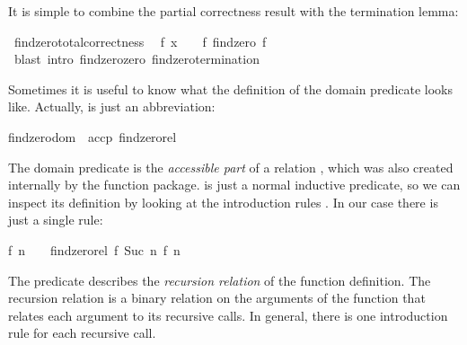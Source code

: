\begin{isabellebody}
%
\isadelimproof
%
\endisadelimproof
%
\begin{isamarkuptext}%
\noindent It is simple to combine the partial correctness result with the
  termination lemma:%
\end{isamarkuptext}%
\isamarkuptrue%
\isamarkupfalse%
\ findzero{\isacharunderscore}total{\isacharunderscore}correctness{\isacharcolon}\isanewline
\ \ {\isachardoublequoteopen}f\ x\ {\isacharequal}\ {}\ {\isasymLongrightarrow}\ f\ {\isacharparenleft}findzero\ f\ {}{\isacharparenright}\ {\isacharequal}\ {}{\isachardoublequoteclose}\isanewline
%
\isadelimproof
%
\endisadelimproof
%
\isatagproof
{}\isamarkupfalse%
\ {\isacharparenleft}blast\ intro{\isacharcolon}\ findzero{\isacharunderscore}zero\ findzero{\isacharunderscore}termination{\isacharparenright}%
\endisatagproof
{\isafoldproof}%
%
\isadelimproof
%
\endisadelimproof
%
\isamarkuptrue%
%
\begin{isamarkuptext}%
Sometimes it is useful to know what the definition of the domain
  predicate looks like. Actually,  is just an
  abbreviation:

  \begin{isabelle}%
findzero{\isacharunderscore}dom\ {\isasymequiv}\ accp\ findzero{\isacharunderscore}rel%
\end{isabelle}

  The domain predicate is the \emph{accessible part} of a relation , which was also created internally by the function
  package.  is just a normal
  inductive predicate, so we can inspect its definition by
  looking at the introduction rules .
  In our case there is just a single rule:

  \begin{isabelle}%
{\isacharquery}f\ {\isacharquery}n\ {\isasymnoteq}\ {}\ {\isasymLongrightarrow}\ findzero{\isacharunderscore}rel\ {\isacharparenleft}{\isacharquery}f{\isacharcomma}\ Suc\ {\isacharquery}n{\isacharparenright}\ {\isacharparenleft}{\isacharquery}f{\isacharcomma}\ {\isacharquery}n{\isacharparenright}%
\end{isabelle}

  The predicate 
  describes the \emph{recursion relation} of the function
  definition. The recursion relation is a binary relation on
  the arguments of the function that relates each argument to its
  recursive calls. In general, there is one introduction rule for each
  recursive call.


\end{isamarkuptext}
\end{isabellebody}
